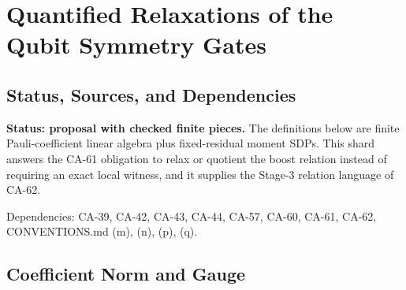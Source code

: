 
\section{Quantified Relaxations of the Qubit Symmetry Gates}
\label{sec:qubit-relaxed-symmetry-gates}

\subsection{Status, Sources, and Dependencies}

\textbf{Status: proposal with checked finite pieces.}  The definitions below
are finite Pauli-coefficient linear algebra plus fixed-residual moment SDPs.
This shard answers the CA-61 obligation to relax or quotient the boost
relation instead of requiring an exact local witness, and it supplies the
Stage-3 relation language of CA-62.

Dependencies: CA-39, CA-42, CA-43, CA-44, CA-57, CA-60, CA-61, CA-62,
CONVENTIONS.md (m), (n), (p), (q).


\subsection{Coefficient Norm and Gauge}

